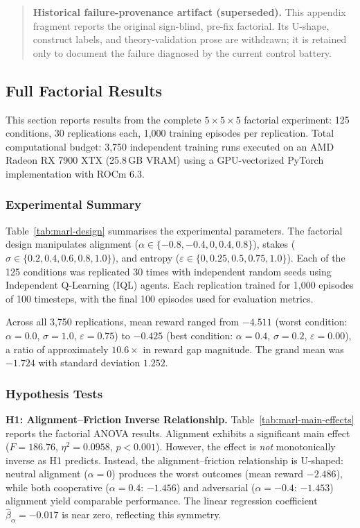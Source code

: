 \begin{quote}\small
\textbf{Historical failure-provenance artifact (superseded).} This appendix fragment reports the
original sign-blind, pre-fix factorial. Its U-shape, construct labels, and theory-validation prose
are withdrawn; it is retained only to document the failure diagnosed by the current control battery.
\end{quote}

\subsection{Full Factorial Results}
\label{sec:marl-full-results}

This section reports results from the complete $5 \times 5 \times 5$ factorial experiment: 125 conditions, 30 replications each, 1,000 training episodes per replication. Total computational budget: 3,750 independent training runs executed on an AMD Radeon RX 7900 XTX (25.8\,GB VRAM) using a GPU-vectorized PyTorch implementation with ROCm 6.3.

\subsubsection{Experimental Summary}

Table~\ref{tab:marl-design} summarises the experimental parameters. The factorial design manipulates alignment ($\alpha \in \{-0.8, -0.4, 0, 0.4, 0.8\}$), stakes ($\sigma \in \{0.2, 0.4, 0.6, 0.8, 1.0\}$), and entropy ($\varepsilon \in \{0, 0.25, 0.5, 0.75, 1.0\}$). Each of the 125 conditions was replicated 30 times with independent random seeds using Independent Q-Learning (IQL) agents. Each replication trained for 1,000 episodes of 100 timesteps, with the final 100 episodes used for evaluation metrics.

Across all 3,750 replications, mean reward ranged from $-4.511$ (worst condition: $\alpha = 0.0$, $\sigma = 1.0$, $\varepsilon = 0.75$) to $-0.425$ (best condition: $\alpha = 0.4$, $\sigma = 0.2$, $\varepsilon = 0.00$), a ratio of approximately $10.6\times$ in reward gap magnitude. The grand mean was $-1.724$ with standard deviation $1.252$.

\subsubsection{Hypothesis Tests}

\textbf{H1: Alignment--Friction Inverse Relationship.} Table~\ref{tab:marl-main-effects} reports the factorial ANOVA results. Alignment exhibits a significant main effect ($F = 186.76$, $\eta^2 = 0.0958$, $p < 0.001$). However, the effect is \emph{not} monotonically inverse as H1 predicts. Instead, the alignment--friction relationship is U-shaped: neutral alignment ($\alpha = 0$) produces the worst outcomes (mean reward $-2.486$), while both cooperative ($\alpha = 0.4$: $-1.456$) and adversarial ($\alpha = -0.4$: $-1.453$) alignment yield comparable performance. The linear regression coefficient $\hat{\beta}_\alpha = -0.017$ is near zero, reflecting this symmetry.

